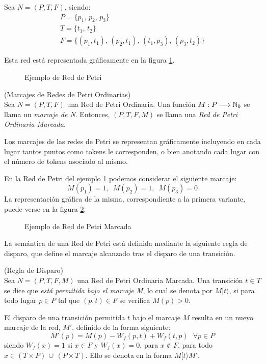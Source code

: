 \begin{example} Sea $N=(P,T,F)$, siendo:
\[\begin{array}{l}
P = \{ p_1,\,p_2,\,p_3\}\\
T = \{ t_1,\,t_2\}\\
F = \{ (p_1,t_1),\,(p_2,t_1),\,(t_1,p_3),\,(p_3,t_2)\}
\end{array}\]

Esta red est\'{a} representada gr\'{a}ficamente en la figura \ref{fig201}.
\end{example}

\begin{figure}

\caption{\label{fig201} Ejemplo de Red de Petri}
\end{figure}

\begin{definition} (Marcajes de Redes de Petri Ordinarias)\\
Sea $N=(P,T,F)$ una Red de Petri Ordinaria.
Una funci\'{o}n $M: P \longrightarrow
\mathbb{N}_{0}$ se llama un {\it marcaje de N}. Entonces,
$(P,T,F,M)$ se llama una {\it Red de Petri Ordinaria Marcada}.
\end{definition}

Los marcajes de las redes de Petri se representan gr\'{a}ficamente
incluyendo en cada lugar tantos puntos como tokens le corresponden,
o bien anotando cada lugar con el n\'{u}mero de tokens asociado al mismo.

\begin{example} En la Red de Petri del ejemplo \ref{fig201} podemos
considerar el siguiente marcaje:
\[ M(p_1) = 1,\,\,\,M(p_2)=1,\,\,\,M(p_3)=0 \]
La representaci\'{o}n gr\'{a}fica de la misma, correspondiente a la
primera variante, puede verse en la figura \ref{fig202}.
\end{example}

\begin{figure}

\caption{\label{fig202} Ejemplo de Red de Petri Marcada}
\end{figure}

La sem\'{a}ntica de una Red de Petri est\'{a} definida mediante la siguiente
regla de disparo, que define el marcaje alcanzado tras el disparo de una
transici\'{o}n.

\begin{definition} (Regla de Disparo)\\
Sea $N=(P,T,F,M)$ una Red de Petri Ordinaria Marcada. Una
transici\'{o}n $t \in T$
se dice que {\it est\'{a} permitida bajo el marcaje M},
lo cual se denota por $M[t\rangle$, si para todo
lugar $p \in P$ tal que $(p,t) \in F$ se verifica $M(p) > 0$.

El disparo de una transici\'{o}n permitida $t$ bajo el marcaje $M$
resulta en un nuevo marcaje de la red, $M'$, definido de la forma
siguiente:
\[M'(p) = M(p) - W_f(p,t) + W_f(t,p)~~~\forall p \in P\]
siendo $W_f(x) = 1$ si $x \in F$ y $W_f(x) = 0$, para $x \not\in F$,
para todo $x \in (T \times P) \, \cup \, (P \times T)$.
Ello se denota en la forma $M[t\rangle M'$.
\end{definition}

